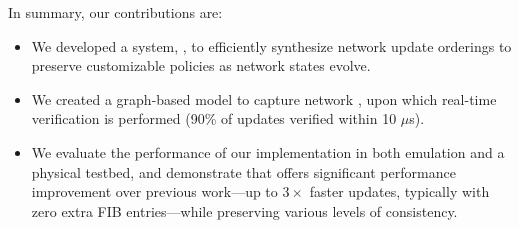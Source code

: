 In summary, our contributions are:
\begin{itemize}[noitemsep,topsep=0pt,leftmargin=*]

\item We developed a system, \name, to efficiently synthesize network update orderings 
to preserve customizable policies as network states evolve.

\item We created a graph-based model to capture network , 
upon which real-time verification is performed (90\% of updates verified within 10 $\mu$s).

\item We evaluate the performance of our \name implementation in both emulation 
and a physical testbed, and demonstrate that \name offers significant performance improvement over previous work---up to $3\times$ faster updates, typically with zero extra FIB entries---while preserving various levels of consistency. 
\end{itemize}
 


